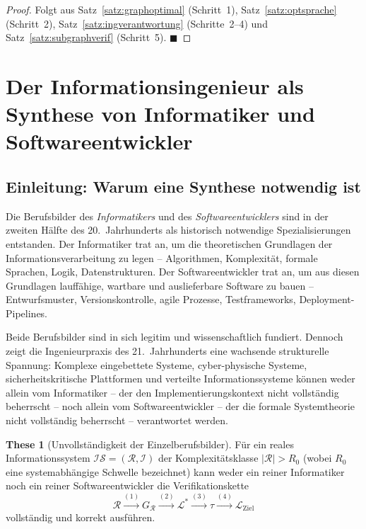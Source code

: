 ﻿\documentclass[a4paper,12pt]{report}
\theoremstyle{definition}
\newtheorem{these}{These}[section]
\begin{document}
\begin{proof}
Folgt aus Satz~\ref{satz:graphoptimal} (Schritt~1),
Satz~\ref{satz:optsprache} (Schritt~2),
Satz~\ref{satz:ingverantwortung} (Schritte~2--4) und
Satz~\ref{satz:subgraphverif} (Schritt~5). $\blacksquare$
\end{proof}


\section{Der Informationsingenieur als Synthese von Informatiker und Softwareentwickler}
\label{ch:synthese}
\label{sec:synthese}

\subsection{Einleitung: Warum eine Synthese notwendig ist}

Die Berufsbilder des \emph{Informatikers} und des \emph{Softwareentwicklers} sind in der
zweiten Hälfte des 20.~Jahrhunderts als historisch notwendige Spezialisierungen entstanden.
Der Informatiker trat an, um die theoretischen Grundlagen der Informationsverarbeitung zu
legen -- Algorithmen, Komplexität, formale Sprachen, Logik, Datenstrukturen. Der
Softwareentwickler trat an, um aus diesen Grundlagen lauffähige, wartbare und auslieferbare
Software zu bauen -- Entwurfsmuster, Versionskontrolle, agile Prozesse, Testframeworks,
Deployment-Pipelines.

Beide Berufsbilder sind in sich legitim und wissenschaftlich fundiert. Dennoch zeigt die
Ingenieurpraxis des 21.~Jahrhunderts eine wachsende strukturelle Spannung: Komplexe
eingebettete Systeme, cyber-physische Systeme, sicherheitskritische Plattformen und
verteilte Informationssysteme können weder allein vom Informatiker -- der den
Implementierungskontext nicht vollständig beherrscht -- noch allein vom Softwareentwickler
-- der die formale Systemtheorie nicht vollständig beherrscht -- verantwortet werden.

\begin{these}[Unvollständigkeit der Einzelberufsbilder]
\label{these:unvollst}
Für ein reales Informationssystem $\mathcal{IS} = (\mathcal{R}, \mathcal{I})$ der
Komplexitätsklasse $|\mathcal{R}| > R_0$ (wobei $R_0$ eine systemabhängige Schwelle
bezeichnet) kann weder ein reiner Informatiker noch ein reiner Softwareentwickler
die Verifikationskette
\[
  \mathcal{R}
  \xrightarrow{(1)} G_\mathcal{R}
  \xrightarrow{(2)} \mathcal{L}^*
  \xrightarrow{(3)} \tau
  \xrightarrow{(4)} \mathcal{L}_{\text{Ziel}}
\]
vollständig und korrekt ausführen.
\end{these}
\end{document}
